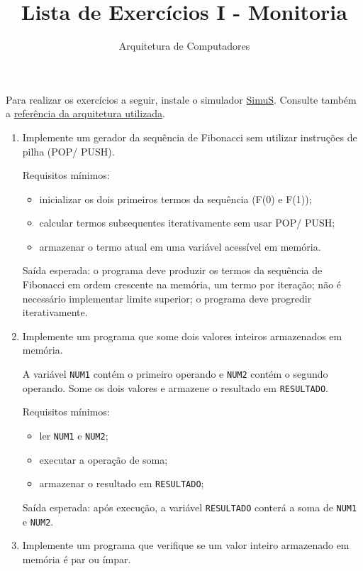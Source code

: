\documentclass[12pt,a4paper]{article}
\title{Lista de Exercícios I - Monitoria}
\author{Arquitetura de Computadores}
\date{}
\begin{document}
\maketitle
\noindent Para realizar os exercícios a seguir, instale o simulador \href{https://github.com/Simulador-Simus/SimuS}{SimuS}. Consulte também a \href{https://github.com/Simulador-SimuS/SimuS/blob/master/docs/simus.pdf}{referência da arquitetura utilizada}.

\begin{enumerate}[left=0pt,label=\textbf{Exercício \arabic*:},itemsep=8pt]

\item Implemente um gerador da sequência de Fibonacci sem utilizar instruções de pilha (POP/ PUSH).

Requisitos mínimos:
\begin{itemize}
	\item inicializar os dois primeiros termos da sequência (F(0) e F(1));
	\item calcular termos subsequentes iterativamente sem usar POP/ PUSH;
	\item armazenar o termo atual em uma variável acessível em memória.
\end{itemize}

Saída esperada: o programa deve produzir os termos da sequência de Fibonacci em ordem crescente na memória, um termo por iteração; não é necessário implementar limite superior; o programa deve progredir iterativamente.

\item Implemente um programa que some dois valores inteiros armazenados em memória.

A variável \texttt{NUM1} contém o primeiro operando e \texttt{NUM2} contém o segundo operando. Some os dois valores e armazene o resultado em \texttt{RESULTADO}.

Requisitos mínimos:
\begin{itemize}
	\item ler \texttt{NUM1} e \texttt{NUM2};
	\item executar a operação de soma;
	\item armazenar o resultado em \texttt{RESULTADO};
\end{itemize}

Saída esperada: após execução, a variável \texttt{RESULTADO} conterá a soma de \texttt{NUM1} e \texttt{NUM2}.

\item Implemente um programa que verifique se um valor inteiro armazenado em memória é par ou ímpar.


\end{enumerate}
\end{document}
